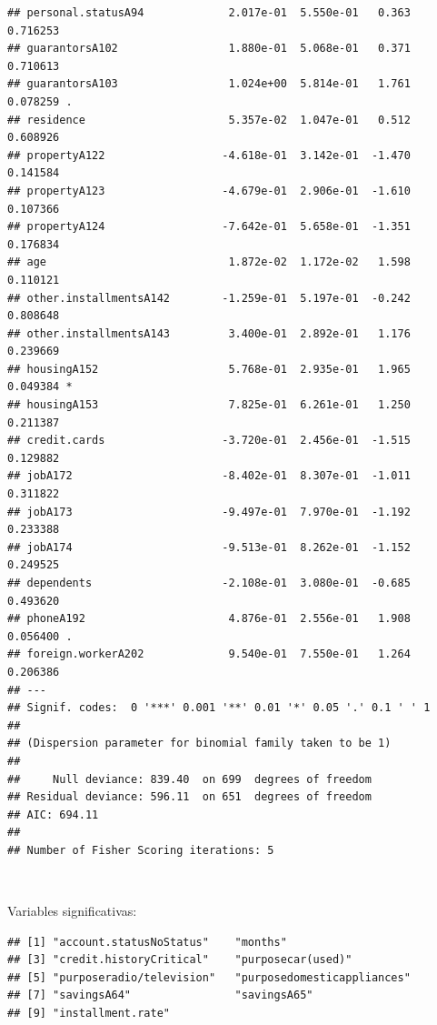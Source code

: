 \documentclass[]{book}
\newenvironment{Shaded}{\begin{snugshade}}{\end{snugshade}}
\newcommand{\KeywordTok}[1]{\textcolor[rgb]{0.13,0.29,0.53}{\textbf{#1}}}
\newcommand{\DecValTok}[1]{\textcolor[rgb]{0.00,0.00,0.81}{#1}}
\newcommand{\FloatTok}[1]{\textcolor[rgb]{0.00,0.00,0.81}{#1}}
\newcommand{\StringTok}[1]{\textcolor[rgb]{0.31,0.60,0.02}{#1}}
\newcommand{\OtherTok}[1]{\textcolor[rgb]{0.56,0.35,0.01}{#1}}
\newcommand{\OperatorTok}[1]{\textcolor[rgb]{0.81,0.36,0.00}{\textbf{#1}}}
\newcommand{\NormalTok}[1]{#1}
\begin{document}
\begin{verbatim}
## personal.statusA94             2.017e-01  5.550e-01   0.363 0.716253    
## guarantorsA102                 1.880e-01  5.068e-01   0.371 0.710613    
## guarantorsA103                 1.024e+00  5.814e-01   1.761 0.078259 .  
## residence                      5.357e-02  1.047e-01   0.512 0.608926    
## propertyA122                  -4.618e-01  3.142e-01  -1.470 0.141584    
## propertyA123                  -4.679e-01  2.906e-01  -1.610 0.107366    
## propertyA124                  -7.642e-01  5.658e-01  -1.351 0.176834    
## age                            1.872e-02  1.172e-02   1.598 0.110121    
## other.installmentsA142        -1.259e-01  5.197e-01  -0.242 0.808648    
## other.installmentsA143         3.400e-01  2.892e-01   1.176 0.239669    
## housingA152                    5.768e-01  2.935e-01   1.965 0.049384 *  
## housingA153                    7.825e-01  6.261e-01   1.250 0.211387    
## credit.cards                  -3.720e-01  2.456e-01  -1.515 0.129882    
## jobA172                       -8.402e-01  8.307e-01  -1.011 0.311822    
## jobA173                       -9.497e-01  7.970e-01  -1.192 0.233388    
## jobA174                       -9.513e-01  8.262e-01  -1.152 0.249525    
## dependents                    -2.108e-01  3.080e-01  -0.685 0.493620    
## phoneA192                      4.876e-01  2.556e-01   1.908 0.056400 .  
## foreign.workerA202             9.540e-01  7.550e-01   1.264 0.206386    
## ---
## Signif. codes:  0 '***' 0.001 '**' 0.01 '*' 0.05 '.' 0.1 ' ' 1
## 
## (Dispersion parameter for binomial family taken to be 1)
## 
##     Null deviance: 839.40  on 699  degrees of freedom
## Residual deviance: 596.11  on 651  degrees of freedom
## AIC: 694.11
## 
## Number of Fisher Scoring iterations: 5
\end{verbatim}

~

Variables significativas:

\begin{Shaded}
\end{Shaded}

\begin{verbatim}
## [1] "account.statusNoStatus"    "months"                   
## [3] "credit.historyCritical"    "purposecar(used)"         
## [5] "purposeradio/television"   "purposedomesticappliances"
## [7] "savingsA64"                "savingsA65"               
## [9] "installment.rate"
\end{verbatim}
\end{document}
